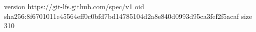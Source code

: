 version https://git-lfs.github.com/spec/v1
oid sha256:8f6701011e45564eff0c0bfd7bd14785104d2a8e840d0993d95ca3fef2f5acaf
size 310
